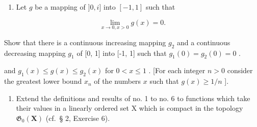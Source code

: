 \begin{enumerate}
\def\labelenumi{\arabic{enumi})}
\setcounter{enumi}{16}
\tightlist
\item
  Let \(g\) be a mapping of \(]0, i]\) into \([-1, 1]\) such that
\end{enumerate}

\[
\lim _ {x \rightarrow 0, x > 0} g (x) = 0.
\]

Show that there is a continuous increasing mapping \(g_{2}\) and a continuous decreasing mapping \(g_{1}\) of {[}0, 1{]} into {[}-1, 1{]} such that \(g_{1}(0) = g_{2}(0) = 0\) .

and \(g_{1}(x) \leqslant g(x) \leqslant g_{2}(x)\) for \(0 < x \leqslant 1\) . {[}For each integer \(n > 0\) consider the greatest lower bound \(x_{n}\) of the numbers \(x\) such that \(g(x) \geqslant 1 / n\) {]}.

\begin{enumerate}
\def\labelenumi{\arabic{enumi})}
\setcounter{enumi}{17}
\tightlist
\item
  Extend the definitions and results of no. 1 to no. 6 to functions which take their values in a linearly ordered set X which is compact in the topology \(\mathfrak{G}_{0}(\mathbf{X})\) (cf.~§ 2, Exercise 6).
\end{enumerate}


